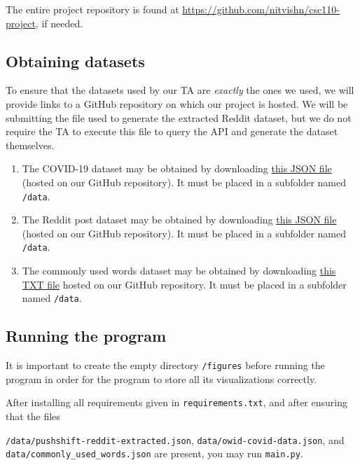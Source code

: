 \documentclass[fontsize=11pt]{article}
\begin{document}
The entire project repository is found at \href{https://github.com/nitvishn/csc110-project}{https://github.com/nitvishn/csc110-project}, if needed.

\subsection{Obtaining datasets}

To ensure that the datasets used by our TA are \textit{exactly} the ones we used, we will provide links to a GitHub repository on which our project is hosted. We will be submitting the file used to generate the extracted Reddit dataset, but we do not require the TA to execute this file to query the API and generate the dataset themselves.

\begin{enumerate}
    \item The COVID-19 dataset may be obtained by downloading \href{https://raw.githubusercontent.com/nitvishn/csc110-project/master/data/owid-covid-data.json}{this JSON file} (hosted on our GitHub repository). It must be placed in a subfolder named \texttt{/data}.
    \item The Reddit post dataset may be obtained by downloading \href{https://raw.githubusercontent.com/nitvishn/csc110-project/master/data/pushshift-reddit-extracted.json}{this JSON file} (hosted on our GitHub repository). It must be placed in a subfolder named \texttt{/data}.
    \item The commonly used words dataset may be obtained by downloading \href{https://raw.githubusercontent.com/nitvishn/csc110-project/master/data/commonly_used_words.txt}{this TXT file} hosted on our GitHub repository. It must be placed in a subfolder named \texttt{/data}.
\end{enumerate}

\subsection{Running the program}

It is important to create the empty directory \texttt{/figures} before running the program in order for the program to store all its visualizations correctly.

After installing all requirements given in \texttt{requirements.txt}, and after ensuring that the files 

\texttt{/data/pushshift-reddit-extracted.json}, \texttt{data/owid-covid-data.json}, and \texttt{data/commonly\_used\_words.json} are present, you may run \texttt{main.py}.
\end{document}

